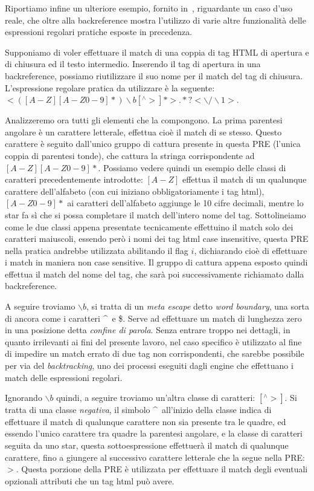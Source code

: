 Riportiamo infine un ulteriore esempio, fornito in~\cite{regexp:tutorial}, riguardante un caso d'uso reale, che oltre alla backreference mostra l'utilizzo di varie altre funzionalità delle espressioni regolari pratiche esposte in precedenza.
\begin{esempio}
	Supponiamo di voler effettuare il match di una coppia di tag HTML di apertura e di chiusura ed il testo intermedio. Inserendo il tag di apertura in una backreference, possiamo riutilizzare il suo nome per il match del tag di chiusura. L'espressione regolare pratica da utilizzare è la seguente: $<([A-Z][A-Z0-9]*)\backslash b[^\wedge >]*>.*?<\backslash/\backslash1>$.
	
	Analizzeremo ora tutti gli elementi che la compongono. La prima parentesi angolare è un carattere letterale, effettua cioè il match di se stesso. Questo carattere è seguito dall'unico gruppo di cattura presente in questa PRE (l'unica coppia di parentesi tonde), che cattura la stringa corrispondente ad $[A-Z][A-Z0-9]*$. Possiamo vedere quindi un esempio delle classi di caratteri precedentemente introdotte: $[A-Z]$ effettua il match di un qualunque carattere dell'alfabeto (con cui iniziano obbligatoriamente i tag html), $[A-Z0-9]*$ ai caratteri dell'alfabeto aggiunge le \num{10} cifre decimali, mentre lo star fa sì che si possa completare il match dell'intero nome del tag. Sottolineiamo come le due classi appena presentate tecnicamente effettuino il match solo dei caratteri maiuscoli, essendo però i nomi dei tag html case insensitive, questa PRE nella pratica andrebbe utilizzata abilitando il flag $i$, dichiarando cioè di effettuare i match in maniera non case sensitive. Il gruppo di cattura appena esposto quindi effettua il match del nome del tag, che sarà poi successivamente richiamato dalla backreference.
	
	A seguire troviamo $\backslash b$, si tratta di un \textit{meta escape} detto \textit{word boundary}, una sorta di ancora come i caratteri \^~e \$. Serve ad effettuare un match di lunghezza zero in una posizione detta \textit{confine di parola}. Senza entrare troppo nei dettagli, in quanto irrilevanti ai fini del presente lavoro, nel caso specifico è utilizzato al fine di impedire un match errato di due tag non corrispondenti, che sarebbe possibile per via del \textit{backtracking}, uno dei processi eseguiti dagli engine che effettuano i match delle espressioni regolari.
	
	Ignorando $\backslash b$ quindi, a seguire troviamo un'altra classe di caratteri: $[^\wedge >]$. Si tratta di una classe \textit{negativa}, il simbolo \^~all'inizio della classe indica di effettuare il match di qualunque carattere non sia presente tra le quadre, ed essendo l'unico carattere tra quadre la parentesi angolare, e la classe di caratteri seguita da uno star, questa sottoespressione effettuerà il match di qualunque carattere, fino a giungere al successivo carattere letterale che la segue nella PRE: $>$. Questa porzione della PRE è utilizzata per effettuare il match degli eventuali opzionali attributi che un tag html può avere.
	

\end{esempio}
